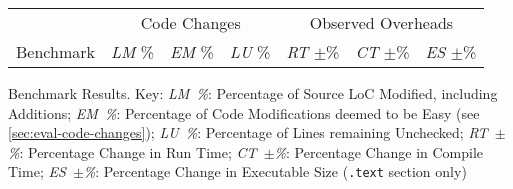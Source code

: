 \centering
\begin{tabular}{lrrrrrr}
\toprule
          & \multicolumn{3}{c}{Code Changes}
          & \multicolumn{3}{c}{Observed Overheads} \\
\addlinespace
Benchmark
          & \multicolumn{1}{c}{\emph{LM} \%}
          & \multicolumn{1}{c}{\emph{EM} \%}
          & \multicolumn{1}{c}{\emph{LU} \%}
          & \multicolumn{1}{c}{\emph{RT} $\pm$\%}
          & \multicolumn{1}{c}{\emph{CT} $\pm$\%}
          & \multicolumn{1}{c}{\emph{ES} $\pm$\%} \\
\midrule

\bottomrule
\end{tabular}
\caption{Benchmark Results. Key: \emph{LM~\%}:
Percentage of Source LoC Modified, including Additions; \emph{EM~\%}:
Percentage of Code Modifications deemed to be Easy (see
\ref{sec:eval-code-changes}); \emph{LU~\%}: Percentage of Lines
remaining Unchecked; \emph{RT~$\pm$\%}: Percentage Change in Run Time;
\emph{CT~$\pm$\%}: Percentage Change in Compile Time;
\emph{ES~$\pm$\%}: Percentage Change in Executable Size
(\texttt{.text} section only)}
\label{tab:bmresults}


